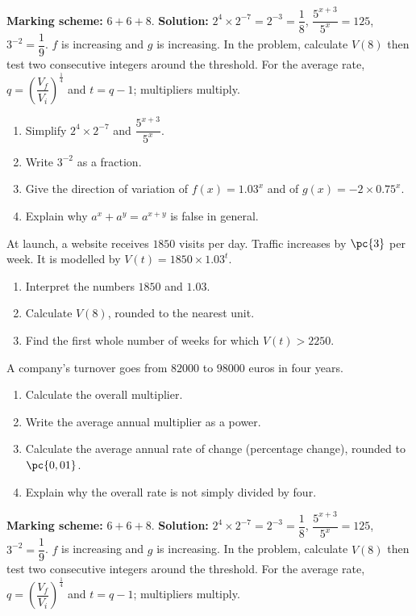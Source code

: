 \begin{solution}\textbf{Marking scheme:} $6+6+8$. \textbf{Solution:} $2^4\times2^{-7}=2^{-3}=\dfrac18$, $\dfrac{5^{x+3}}{5^x}=125$, $3^{-2}=\dfrac19$. $f$ is increasing and $g$ is increasing. In the problem, calculate $V(8)$ then test two consecutive integers around the threshold. For the average rate, $q=\left(\dfrac{V_f}{V_i}\right)^{\frac14}$ and $t=q-1$; multipliers multiply.\end{solution}

\begin{exercise}
\begin{enumerate}
\item Simplify $2^4\times2^{-7}$ and $\dfrac{5^{x+3}}{5^x}$.
\item Write $3^{-2}$ as a fraction.
\item Give the direction of variation of $f(x)=\num{1,03}^x$ and of $g(x)=-2\times\num{0,75}^x$.
\item Explain why $a^x+a^y=a^{x+y}$ is false in general.
\end{enumerate}
\end{exercise}
\begin{exercise}
At launch, a website receives $1850$ visits per day. Traffic increases by $\pc{3}$ per week. It is modelled by $V(t)=1850\times\num{1,03}^t$.
\begin{enumerate}
\item Interpret the numbers $1850$ and $\num{1,03}$.
\item Calculate $V(8)$, rounded to the nearest unit.
\item Find the first whole number of weeks for which $V(t)>2250$.
\end{enumerate}
\end{exercise}
\begin{exercise}
A company's turnover goes from $\num{82000}$ to $98000$ euros in four years.
\begin{enumerate}
\item Calculate the overall multiplier.
\item Write the average annual multiplier as a power.
\item Calculate the average annual rate of change (percentage change), rounded to $\pc{0,01}$.
\item Explain why the overall rate is not simply divided by four.
\end{enumerate}
\end{exercise}
\begin{solution}\textbf{Marking scheme:} $6+6+8$. \textbf{Solution:} $2^4\times2^{-7}=2^{-3}=\dfrac18$, $\dfrac{5^{x+3}}{5^x}=125$, $3^{-2}=\dfrac19$. $f$ is increasing and $g$ is increasing. In the problem, calculate $V(8)$ then test two consecutive integers around the threshold. For the average rate, $q=\left(\dfrac{V_f}{V_i}\right)^{\frac14}$ and $t=q-1$; multipliers multiply.\end{solution}

